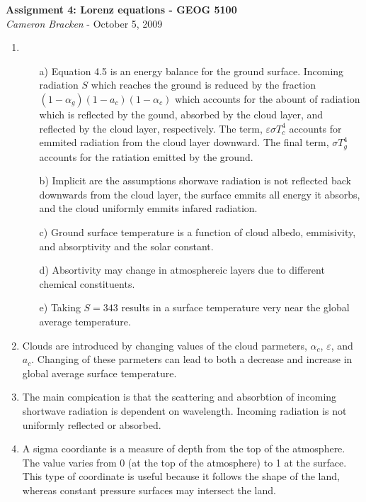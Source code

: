 \documentclass[11pt,oneside]{article}
\begin{document}
\begin{center}
	\textbf{Assignment 4: Lorenz equations - GEOG 5100}\\
	{\itshape Cameron Bracken} - October 5, 2009
\end{center}


\begin{enumerate}
\item 
\begin{enumerate}
	\item[a)] Equation 4.5 is an energy balance for the ground surface. Incoming radiation $S$ which reaches the ground is reduced by the fraction $(1-\alpha_g)(1-a_c)(1-\alpha_c)$ which accounts for the abount of radiation which is reflected by the gound, absorbed by the cloud layer, and reflected by the cloud layer, respectively.  The term, $\varepsilon\sigma T_c^4$ accounts for emmited radiation from the cloud layer downward. The final term, $\sigma T_g^4$ accounts for the ratiation emitted by the ground. 
	\item[b)] Implicit are the assumptions shorwave radiation is not reflected back downwards from the cloud layer, the surface emmits all energy it absorbs, and the cloud uniformly emmits infared radiation.   
	\item[c)] Ground surface temperature is a function of cloud albedo, emmisivity, and absorptivity and the solar constant. 
	\item[d)] Absortivity may change in atmosphereic layers due to different chemical constituents. 
	\item[e)] Taking $S=343$ results in a surface temperature very near the global average temperature. 
\end{enumerate}

\item  Clouds are introduced by changing values of the cloud parmeters, $\alpha_c$, $\varepsilon$, and $a_c$.  Changing of these parmeters can lead to both a decrease and increase in global average surface temperature. 

\item The main compication is that the scattering and absorbtion of incoming shortwave radiation is dependent on wavelength.  Incoming radiation is not uniformly reflected or absorbed. 

\item A sigma coordiante is a measure of depth from the top of the atmosphere. The value varies from 0 (at the top of the atmosphere) to 1 at the surface.  This type of coordinate is useful because it follows the shape of the land, whereas constant pressure surfaces may intersect the land. 


\end{enumerate}
\end{document}
